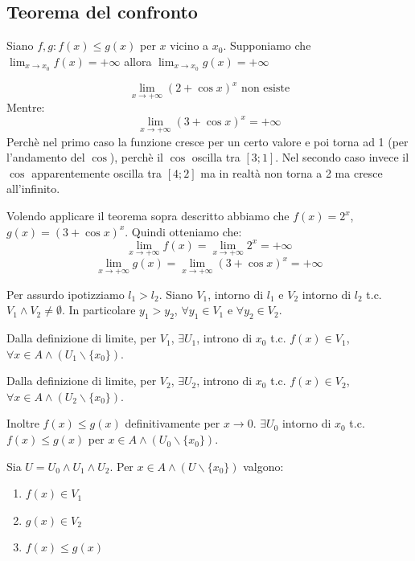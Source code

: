 \subsection*{Teorema del confronto}
Siano $f,g:f(x)\leq g(x)$ per $x$ vicino a $x_0$. Supponiamo che $\lim_{x\to x_0}f(x)=+\infty$ allora $\lim_{x\to x_0}g(x)=+\infty$
\begin{example}
    \begin{equation*}
        \lim_{x\to +\infty}(2+\cos x)^x \text{ non esiste}
    \end{equation*}
    Mentre:
    \begin{equation*}
        \lim_{x\to +\infty}(3+\cos x)^x=+\infty    
    \end{equation*}
    Perchè nel primo caso la funzione cresce per un certo valore e poi torna ad 1 (per l'andamento del $\cos$), perchè il $\cos$ oscilla tra $[3;1]$. Nel secondo caso invece il $\cos$ apparentemente oscilla tra $[4;2]$ ma in realtà non torna a 2 ma cresce all'infinito.
    
    Volendo applicare il teorema sopra descritto abbiamo che $f(x)=2^x$, $g(x)=(3+\cos x)^x$. Quindi otteniamo che:
    \begin{equation*}
        \lim_{x\to +\infty}f(x)=\lim_{x\to +\infty}2^x=+\infty
    \end{equation*}
    \begin{equation*}
        \lim_{x\to +\infty}g(x)=\lim_{x\to +\infty}(3+\cos x)^x=+\infty
    \end{equation*}
\end{example}

\begin{dimostration}
    Per assurdo ipotizziamo $l_1>l_2$. Siano $V_1$, intorno di $l_1$ e $V_2$ intorno di $l_2$ t.c. $V_1\land V_2\neq\emptyset$. In particolare $y_1>y_2$, $\forall y_1\in V_1$ e $\forall y_2\in V_2$.
    
    Dalla definizione di limite, per $V_1$, $\exists U_1$, introno di $x_0$ t.c. $f(x)\in V_1$, $\forall x \in A\land(U_1\backslash\{x_0\})$.
    
    Dalla definizione di limite, per $V_2$, $\exists U_2$, introno di $x_0$ t.c. $f(x)\in V_2$, $\forall x \in A\land(U_2\backslash\{x_0\})$.
    
    Inoltre $f(x)\leq g(x)$ definitivamente per $x\to0$. $\exists U_0$ intorno di $x_0$ t.c. $f(x)\leq g(x)$ per $x\in A\land(U_0\backslash\{x_0\})$.
    
    Sia $U=U_0\land U_1\land U_2$. Per $x\in A\land(U\backslash\{x_0\})$ valgono:
    \begin{enumerate}
        \item $f(x)\in V_1$
        \item $g(x)\in V_2$
        \item $f(x)\leq g(x)$
    \end{enumerate}
\end{dimostration}

